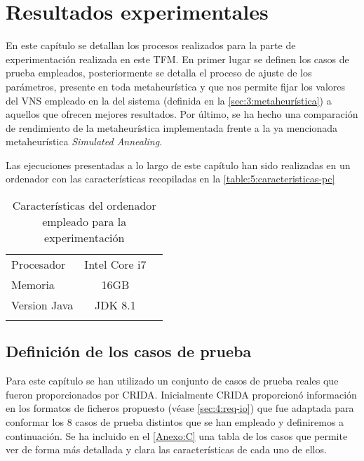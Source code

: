 \graphicspath{{capitulos/Capitulo5-Resultados-experimentales/recursos/}}

\section{Resultados experimentales} \label{capitulo:5}

En este capítulo se detallan los procesos realizados para la parte de experimentación realizada en este TFM. En primer lugar se definen los casos de prueba empleados, posteriormente se detalla el proceso de ajuste de los parámetros, presente en toda metaheurística y que nos permite fijar los valores del VNS empleado en la \fasedos{} del sistema (definida en la \autoref{sec:3:metaheurística}) a aquellos que ofrecen mejores resultados. Por último, se ha hecho una comparación de rendimiento de la metaheurística implementada frente a la ya mencionada metaheurística \textit{Simulated Annealing}.

Las ejecuciones presentadas a lo largo de este capítulo han sido realizadas en un ordenador con las características recopiladas en la \autoref{table:5:caracteristicas-pc}

\begin{table}[h]
	\centering
	\caption{Características del ordenador empleado para la experimentación}
	\begin{tabular}{lcc}
		\hline
		Procesador   & Intel Core i7 &  \\
		Memoria      &     16GB      &  \\
		Version Java &    JDK 8.1    &  \\ \hline
		             &               &
	\end{tabular}
\label{table:5:caracteristicas-pc}
\end{table}

\subsection{Definición de los casos de prueba}
Para este capítulo se han utilizado un conjunto de casos de prueba reales que fueron proporcionados por CRIDA. Inicialmente CRIDA proporcionó información en los formatos de ficheros propuesto (véase \autoref{sec:4:req-io}) que fue adaptada para conformar los 8 casos de prueba distintos que se han empleado y definiremos a continuación. Se ha incluido en el \autoref{Anexo:C} una tabla de los casos que permite ver de forma más detallada y clara las características de cada uno de ellos.

